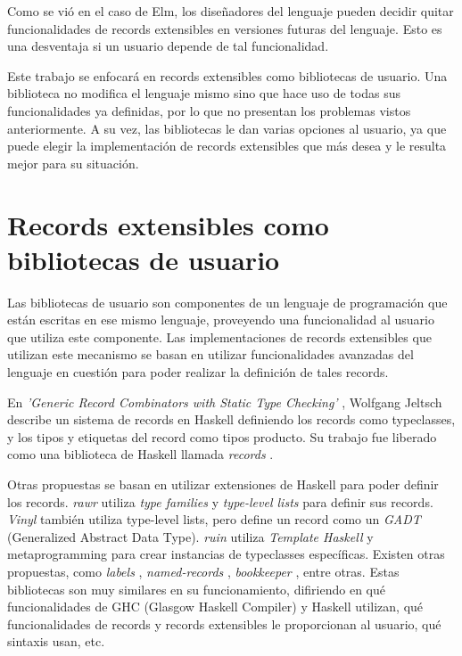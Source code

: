 Como se vió en el caso de Elm, los diseñadores del lenguaje pueden decidir quitar funcionalidades de records extensibles en versiones futuras del lenguaje. Esto es una desventaja si un usuario depende de tal funcionalidad.

Este trabajo se enfocará en records extensibles como bibliotecas de usuario. Una biblioteca no modifica el lenguaje mismo sino que hace uso de todas sus funcionalidades ya definidas, por lo que no presentan los problemas vistos anteriormente. A su vez, las bibliotecas le dan varias opciones al usuario, ya que puede elegir la implementación de records extensibles que más desea y le resulta mejor para su situación.

\section{Records extensibles como bibliotecas de usuario}

Las bibliotecas de usuario son componentes de un lenguaje de programación que están escritas en ese mismo lenguaje, proveyendo una funcionalidad al usuario que utiliza este componente. Las implementaciones de records extensibles que utilizan este mecanismo se basan en utilizar funcionalidades avanzadas del lenguaje en cuestión para poder realizar la definición de tales records.

En \textit{'Generic Record Combinators with Static Type Checking'} \cite{Jeltsch:2010:GRC:1836089.1836108}, Wolfgang Jeltsch describe un sistema de records en Haskell definiendo los records como typeclasses, y los tipos y etiquetas del record como tipos producto. Su trabajo fue liberado como una biblioteca de Haskell llamada \textit{records} \cite{HaskellRecords}.

Otras propuestas se basan en utilizar extensiones de Haskell para poder definir los records. \textit{rawr} \cite{HaskellRawr} utiliza \textit{type families} y \textit{type-level lists} para definir sus records. \textit{Vinyl} \cite{HaskellVinyl} también utiliza type-level lists, pero define un record como un \textit{GADT} (Generalized Abstract Data Type). \textit{ruin} \cite{HaskellRuin} utiliza \textit{Template Haskell} y metaprogramming para crear instancias de typeclasses específicas. Existen otras propuestas, como \textit{labels} \cite{HaskellLabels}, \textit{named-records} \cite{HaskellNamedRecords}, \textit{bookkeeper} \cite{HaskellBookkeeper}, entre otras. Estas bibliotecas son muy similares en su funcionamiento, difiriendo en qué funcionalidades de GHC (Glasgow Haskell Compiler) y Haskell utilizan, qué funcionalidades de records y records extensibles le proporcionan al usuario, qué sintaxis usan, etc.

